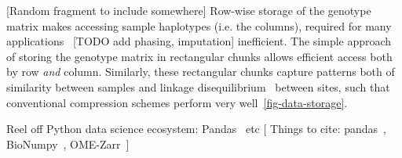 \documentclass[a4paper,num-refs]{oup-contemporary}
\begin{document}


[Random fragment to include somewhere]
Row-wise storage of the genotype matrix makes accessing 
sample haplotypes (i.e. the columns),
required for many
applications~\cite[e.g.][]{durbin2014efficient,kelleher2019inferring} 
[TODO add phasing, imputation]
inefficient. The simple approach of storing the genotype matrix
in rectangular chunks allows efficient access both by row \emph{and}
column. Similarly, these rectangular chunks capture patterns
both of similarity between samples and linkage disequilibrium~\cite{mcvean2019linkage} 
between sites, such that conventional compression schemes 
perform very well~\ref{fig-data-storage}.


Reel off Python data science ecosystem: Pandas~\citep{mckinney2010data} etc
[ Things to cite: pandas~\citep{mckinney2010data},
BioNumpy~\citep{rand2022bionumpy}, OME-Zarr~\citep{moore2023ome}]
\end{document}
